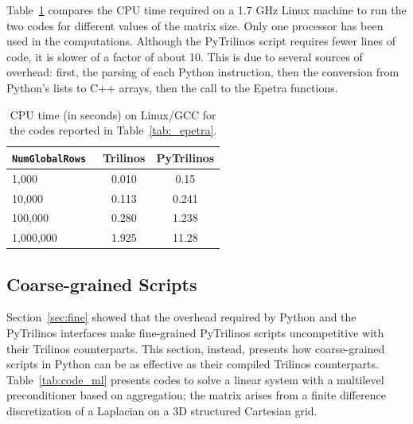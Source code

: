 \documentclass[acmtocl]{acmtrans2m}
\begin{document}
Table~\ref{tab:time_epetra} compares the CPU time required on a 1.7
GHz Linux machine to run the two codes for different values of the
matrix size. Only one processor has been used in the computations.
Although the PyTrilinos script requires fewer lines of code, it is
slower of a factor of about 10. This is due to several sources of
overhead: first, the parsing of each Python instruction, then the
conversion from Python's lists to C++ arrays, then the call to the
Epetra functions.

\begin{table}
  \begin{center}
    \begin{tabular}{| l | c | c |}
      \hline
      \tt NumGlobalRows & Trilinos & PyTrilinos \\
      \hline
      1,000     & 0.010 & 0.15  \\
      10,000    & 0.113 & 0.241 \\
      100,000   & 0.280 & 1.238 \\
      1,000,000 & 1.925 & 11.28 \\
      \hline
    \end{tabular}
    \caption{CPU time (in seconds) on Linux/GCC for the codes reported
      in Table~\ref{tab:_epetra}.}
    \label{tab:time_epetra}
  \end{center}
\end{table}

\subsection{Coarse-grained Scripts}
\label{sec:coarse}

Section~\ref{sec:fine} showed that the overhead required by Python and
the PyTrilinos interfaces make fine-grained PyTrilinos scripts
uncompetitive with their Trilinos counterparts. This section, instead,
presents how coarse-grained scripts in Python can be as effective as
their compiled Trilinos counterparts.  Table~\ref{tab:code_ml}
presents codes to solve a linear system with a multilevel
preconditioner based on aggregation; the matrix arises from a finite
difference discretization of a Laplacian on a 3D structured Cartesian
grid.
\end{document}
